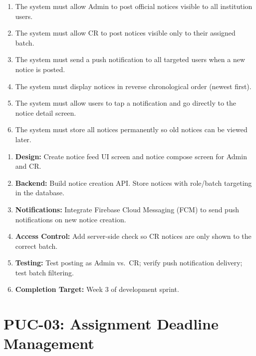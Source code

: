 \documentclass[12pt,a4paper]{article}
\begin{document}
\begin{tcolorbox}[frbox, title={Functional Requirements --- PUC-02}]
\begin{enumerate}[leftmargin=*, label=\textbf{FR-02.\arabic*}, itemsep=5pt]
  \item The system must allow Admin to post official notices visible to all institution users.
  \item The system must allow CR to post notices visible only to their assigned batch.
  \item The system must send a push notification to all targeted users when a new notice is posted.
  \item The system must display notices in reverse chronological order (newest first).
  \item The system must allow users to tap a notification and go directly to the notice detail screen.
  \item The system must store all notices permanently so old notices can be viewed later.
\end{enumerate}
\end{tcolorbox}

\begin{tcolorbox}[planbox, title={Completion Plan --- PUC-02}]
\begin{enumerate}[leftmargin=*, label=\textbf{Step \arabic*:}, itemsep=4pt]
  \item \textbf{Design:} Create notice feed UI screen and notice compose screen for Admin and CR.
  \item \textbf{Backend:} Build notice creation API. Store notices with role/batch targeting in the database.
  \item \textbf{Notifications:} Integrate Firebase Cloud Messaging (FCM) to send push notifications on new notice creation.
  \item \textbf{Access Control:} Add server-side check so CR notices are only shown to the correct batch.
  \item \textbf{Testing:} Test posting as Admin vs.\ CR; verify push notification delivery; test batch filtering.
  \item \textbf{Completion Target:} Week 3 of development sprint.
\end{enumerate}
\end{tcolorbox}
\newpage
\section{PUC-03: Assignment Deadline Management}
\end{document}
